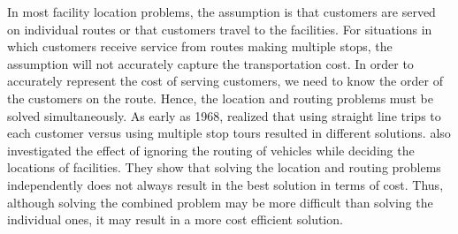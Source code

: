 In most facility location problems, the assumption is that customers are served on individual routes 
or that customers travel to the facilities. For situations in which customers receive service from 
routes making multiple stops, the assumption will not accurately capture the transportation cost.
In order to accurately represent the cost of serving customers, we need to know the order of the 
customers on the route. Hence, the location and routing problems must be solved simultaneously. 
As early as 1968, \citet{Webb} realized that using straight line trips to each customer versus
using multiple stop tours resulted in different solutions. \citet{Salhi} also investigated the 
effect of ignoring the routing of vehicles while deciding the locations of facilities. They show 
that solving the location and routing problems independently does not always result in  the best 
solution in terms of cost. Thus, although solving the combined problem may be more difficult than 
solving the individual ones, it may result in a more cost efficient solution. 


